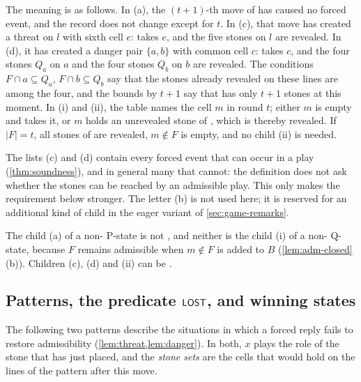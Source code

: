 The meaning is as follows. In \textup{(a)}, the $(t+1)$-th move of \Maker{} has caused no forced event, and the
record does not change except for $t$. In \textup{(c)}, that move has created a threat on $l$ with sixth
cell $e$: \Breaker{} takes $e$, and the five stones on $l$ are revealed. In \textup{(d)}, it has created a
danger pair $\{a,b\}$ with common cell $c$: \Breaker{} takes $c$, and the four stones $Q_a$ on $a$ and the
four stones $Q_b$ on $b$ are revealed. The conditions $F\cap a\subseteq Q_a$, $F\cap b\subseteq Q_b$ say that
the stones already revealed on these lines are among the four, and the bounds by $t+1$ say that \Maker{}
has only $t+1$ stones at this moment. In \textup{(i)} and \textup{(ii)}, the table names the cell $m$ in round
$t$; either $m$ is empty and \Breaker{} takes it, or $m$ holds an unrevealed stone of \Maker, which is thereby
revealed. If $|F|=t$, all stones of \Maker{} are revealed, $m\notin F$ is empty, and no child \textup{(ii)} is
needed.

The lists \textup{(c)} and \textup{(d)} contain every forced event that can occur in a play
(\cref{thm:soundness}), and in general many that cannot: the definition does not ask whether the
stones can be reached by an admissible play. This only makes the requirement \WON{} below stronger. The
letter \textup{(b)} is not used here; it is reserved for an additional kind of child in the eager variant of
\cref{sec:game-remarks}.

The child \textup{(a)} of a non-\VOID{} P-state is not \VOID, and neither is the child \textup{(i)} of a
non-\VOID{} Q-state, because $F$ remains admissible when $m\notin F$ is added to $B$
(\cref{lem:adm-closed}\,(b)). Children \textup{(c)}, \textup{(d)} and \textup{(ii)} can be \VOID.

\subsection{Patterns, the predicate \texorpdfstring{$\mathsf{LOST}$}{LOST}, and winning states}\label{sec:won}

The following two patterns describe the situations in which a forced reply fails to restore admissibility
(\cref{lem:threat,lem:danger}). In both, $x$ plays the role of the stone that \Maker{} has
just placed, and the \emph{stone sets} are the cells that \Maker{} would hold on the lines of the pattern
after this move.

